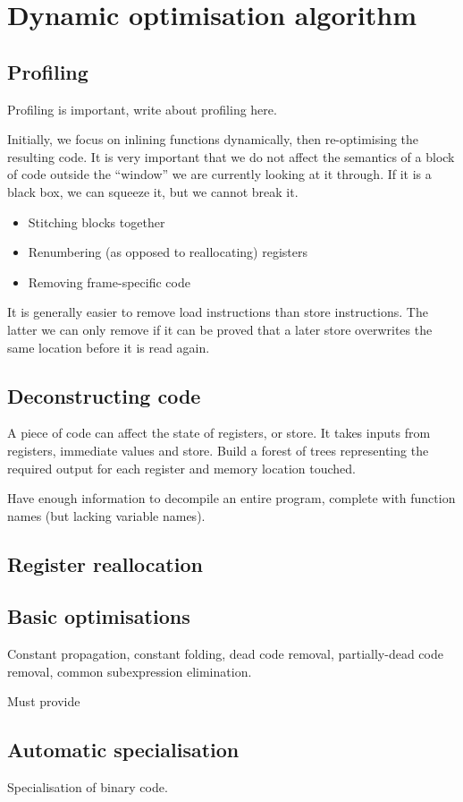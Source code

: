 \chapter{Dynamic optimisation algorithm}

\section{Profiling}

Profiling is important, write about profiling here.

Initially, we focus on inlining functions dynamically, then re-optimising the resulting code. It is very important that we do not affect the semantics of a block of code outside the ``window'' we are currently looking at it through. If it is a black box, we can squeeze it, but we cannot break it.

\begin{itemize}
\item Stitching blocks together
\item Renumbering (as opposed to reallocating) registers
\item Removing frame-specific code
\end{itemize}

It is generally easier to remove load instructions than store instructions. The latter we can only remove if it can be proved that a later store overwrites the same location before it is read again.

\section{Deconstructing code}

A piece of code can affect the state of registers, or store. It takes inputs from registers, immediate values and store. Build a forest of trees representing the required output for each register and memory location touched.

Have enough information to decompile an entire program, complete with function names (but lacking variable names).

\section{Register reallocation}

\section{Basic optimisations}

Constant propagation, constant folding, dead code removal, partially-dead code removal, common subexpression elimination.

Must provide 

\section{Automatic specialisation}

Specialisation of binary code.

